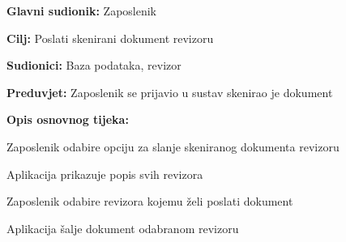 					\noindent {}
					\begin{packed_item}
	
						\item \textbf{Glavni sudionik:} Zaposlenik
						\item  \textbf{Cilj:} Poslati skenirani dokument revizoru
						\item  \textbf{Sudionici:} Baza podataka, revizor
						\item  \textbf{Preduvjet:} Zaposlenik se prijavio u sustav skenirao je dokument
						\item  \textbf{Opis osnovnog tijeka:}
						
						\item[] \begin{packed_enum}
	
							\item Zaposlenik odabire opciju za slanje skeniranog dokumenta revizoru
							\item Aplikacija prikazuje popis svih revizora
							\item Zaposlenik odabire revizora kojemu želi poslati dokument
							\item Aplikacija šalje dokument odabranom revizoru

						\end{packed_enum}

					\end{packed_item}


